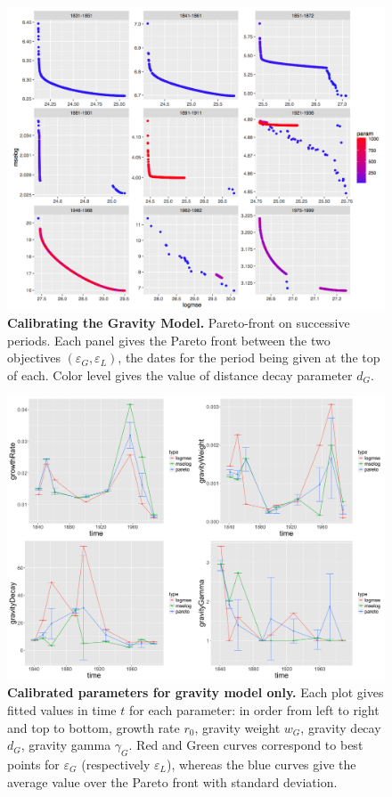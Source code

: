 \documentclass[Royal,sageh,times]{sagej}
\begin{document}
\begin{figure}
\centering
\includegraphics[width=\textwidth]{figures/Fig4}
\caption{\textbf{Calibrating the Gravity Model.} Pareto-front on successive periods. Each panel gives the Pareto front between the two objectives $(\varepsilon_G,\varepsilon_L)$, the dates for the period being given at the top of each. Color level gives the value of distance decay parameter $d_G$.}
\label{fig:gravity-pareto}
\end{figure}


\begin{figure}
\centering
\includegraphics[width=\textwidth]{figures/Fig5}
\caption{\textbf{Calibrated parameters for gravity model only.} Each plot gives fitted values in time $t$ for each parameter: in order from left to right and top to bottom, growth rate $r_0$, gravity weight $w_G$, gravity decay $d_G$, gravity gamma $\gamma_G$. Red and Green curves correspond to best points for $\varepsilon_G$ (respectively $\varepsilon_L$), whereas the blue curves give the average value over the Pareto front with standard deviation.}
\label{fig:gravity-params}
\end{figure}
\end{document}
